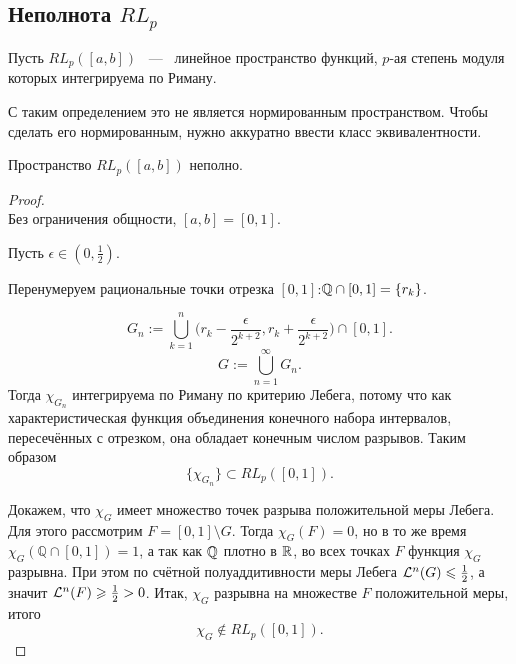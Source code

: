 \subsection{Неполнота $RL_p$}

\begin{definition}
	Пусть $RL_p([a, b])$ ~---~ линейное пространство функций, $p$-ая степень модуля которых интегрируема по Риману.
\end{definition}
\begin{remark}
	С таким определением это не является нормированным пространством. Чтобы сделать его нормированным, нужно аккуратно ввести класс эквивалентности.
\end{remark}
\begin{theorem}
	Пространство $RL_p([a, b])$ неполно.
\end{theorem}
\begin{proof} \ \\ 
	Без ограничения общности, $[a, b] = [0, 1]$.
	
	Пусть $\epsilon \in (0, \frac{1}{2})$.
	
	Перенумеруем рациональные точки отрезка $[0, 1]$:\quad $\mathbb{Q} \cap [0, 1] = \{r_k\}$.
	
	\[
	G_n := \bigcup_{k=1}^n \Big(r_k - \frac{\epsilon}{2^{k+2}}, r_k + \frac{\epsilon}{2^{k+2}}\Big) \cap  [0, 1].
	\]\[
	G := \bigcup_{n = 1}^\infty G_n.
	\]
	\begingroup
	\renewcommand{\theequation}{\arabic{equation}}
	Тогда $\chi_{G_n}$ интегрируема по Риману по критерию Лебега, потому что как характеристическая функция объединения конечного набора интервалов, пересечённых с отрезком, она обладает конечным числом разрывов. Таким образом
	\begin{equation}
		\{\chi_{G_n}\} \subset RL_p([0, 1]).
		\label{rlp:gn_rlp}
	\end{equation}
	
	Докажем, что $\chi_G$ имеет множество точек разрыва положительной меры Лебега. Для этого рассмотрим $F = [0, 1] \setminus G$. Тогда $\chi_G(F) = 0$, но в то же время $\chi_G(\mathbb{Q} \cap [0, 1]) = 1$, а так как $\mathbb{Q}$ плотно в $\mathbb{R}$, во всех точках $F$ функция $\chi_G$ разрывна. При этом по счётной полуаддитивности меры Лебега $\mathcal{L}^n(G) \leqslant \frac{1}{2}$, а значит $\mathcal{L}^n(F) \geqslant \frac{1}{2} > 0$. Итак, $\chi_G$ разрывна на множестве $F$ положительной меры, итого
	\begin{equation}
		\chi_G \not\in RL_p([0, 1]).
		\label{rlp:g_nrlp}
	\end{equation}
	

\end{proof}
